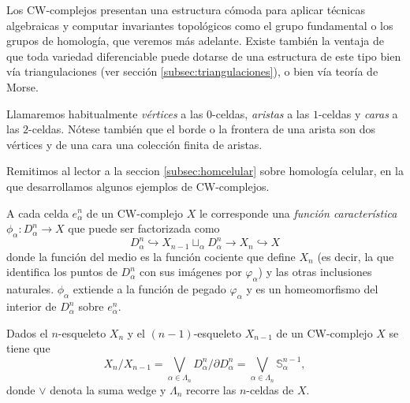 Los CW-complejos presentan una estructura cómoda para aplicar técnicas algebraicas y computar invariantes topológicos como el grupo fundamental o los grupos de homología, que veremos más adelante. Existe también la ventaja de que toda variedad diferenciable puede dotarse de una estructura de este tipo bien vía triangulaciones (ver sección \ref{subsec:triangulaciones}), o bien vía teoría de Morse.

\begin{nota}
    Llamaremos habitualmente \textit{vértices} a las $0$-celdas, \textit{aristas} a las $1$-celdas y \textit{caras} a las $2$-celdas. Nótese también que el borde o la frontera de una arista son dos vértices y de una cara una colección finita de aristas.
\end{nota}

Remitimos al lector a la seccion \ref{subsec:homcelular} sobre homología celular, en la que desarrollamos algunos ejemplos de CW-complejos.

\medskip

\begin{definition}
    A cada celda $e^n_{\alpha}$ de un CW-complejo $X$ le corresponde una \textit{función característica} $\phi_{\alpha} : D^n_{\alpha}\to X$ que puede ser factorizada como
    \begin{equation*}
        D^n_{\alpha} \hookrightarrow X_{n-1} \sqcup_{\alpha} D^n_{\alpha} \to X_n \hookrightarrow X
    \end{equation*}
    donde la función del medio es la función cociente que define $X_n$ (es decir, la que identifica los puntos de $D^n_{\alpha}$ con sus imágenes por $\varphi_{\alpha}$) y las otras inclusiones naturales. $\phi_{\alpha}$ extiende a la función de pegado $\varphi_{\alpha}$ y es un homeomorfismo del interior de $D^n_{\alpha}$ sobre $e^n_{\alpha}$.

\end{definition}
\bigskip

\begin{proposition}
    Dados el $n$-esqueleto $X_n$ y el $(n-1)$-esqueleto $X_{n-1}$ de un CW-complejo $X$ se tiene que 
    \begin{equation*}
        X_n/X_{n-1} = \bigvee_{\alpha\in\Lambda_n} D^n_{\alpha}/\partial D^n_{\alpha} = \bigvee_{\alpha\in\Lambda_n} \mathbb{S}^{n-1}_{\alpha},
    \end{equation*}
    donde $\vee$ denota la suma wedge \cite[p.~10]{hatcher2002} y $\Lambda_n$ recorre las $n$-celdas de $X$.
\end{proposition}

